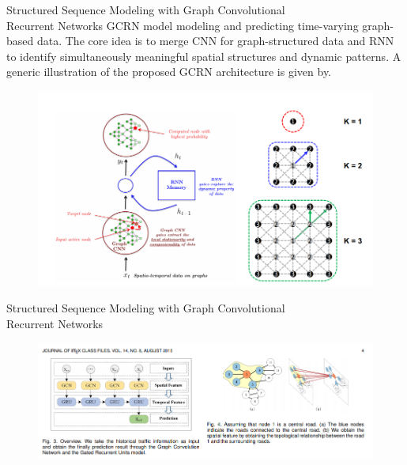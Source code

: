 \documentclass{beamer}
\begin{document}
	\begin{frame}[t]{Structured Sequence Modeling with Graph Convolutional\\ Recurrent Networks}
		GCRN model modeling and predicting time-varying graph-based data. The core idea is to merge CNN for graph-structured data and RNN to identify simultaneously meaningful spatial structures and dynamic patterns. A generic illustration of the proposed GCRN architecture is given by.
		\begin{figure}
			\centering
			\includegraphics[scale=0.3]{tgcn.png}
		\end{figure}
	\end{frame}
	
	\begin{frame}{Structured Sequence Modeling with Graph Convolutional\\ Recurrent Networks}
		\begin{figure}
			\centering
			\includegraphics[scale=0.5]{tgcn2.png}
		\end{figure}
	\end{frame}
\end{document}
